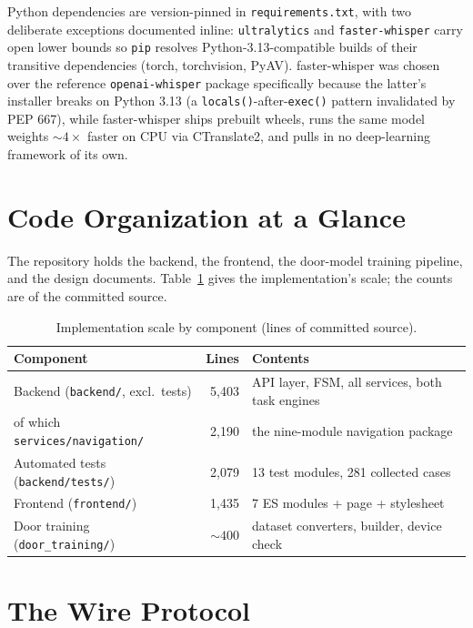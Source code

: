 Python dependencies are version-pinned in \texttt{requirements.txt}, with two
deliberate exceptions documented inline: \texttt{ultralytics} and
\texttt{faster-whisper} carry open lower bounds so \texttt{pip} resolves
Python-3.13-compatible builds of their transitive dependencies (torch,
torchvision, PyAV). faster-whisper was chosen over the reference
\texttt{openai-whisper} package specifically because the latter's installer breaks
on Python 3.13 (a \texttt{locals()}-after-\texttt{exec()} pattern invalidated by
PEP 667), while faster-whisper ships prebuilt wheels, runs the same model weights
${\sim}4\times$ faster on CPU via CTranslate2, and pulls in no deep-learning
framework of its own.

\section{Code Organization at a Glance}
\label{sec:code_org}

The repository holds the backend, the frontend, the door-model training pipeline,
and the design documents. Table~\ref{tab:loc} gives the implementation's scale;
the counts are of the committed source.

\begin{table}[!htbp]
\centering
\caption[Implementation scale]{Implementation scale by component (lines of committed source).}
\label{tab:loc}
\small
\begin{tabular}{p{6.4cm} r p{5.2cm}}
\toprule
\textbf{Component} & \textbf{Lines} & \textbf{Contents} \\
\midrule
Backend (\texttt{backend/}, excl.\ tests) & 5{,}403 & API layer, FSM, all services, both task engines \\
\quad of which \texttt{services/navigation/} & 2{,}190 & the nine-module navigation package \\
Automated tests (\texttt{backend/tests/}) & 2{,}079 & 13 test modules, 281 collected cases \\
Frontend (\texttt{frontend/}) & 1{,}435 & 7 ES modules + page + stylesheet \\
Door training (\texttt{door\_training/}) & ${\sim}400$ & dataset converters, builder, device check \\
\bottomrule
\end{tabular}
\end{table}

\section{The Wire Protocol}
\label{sec:wire_protocol}

